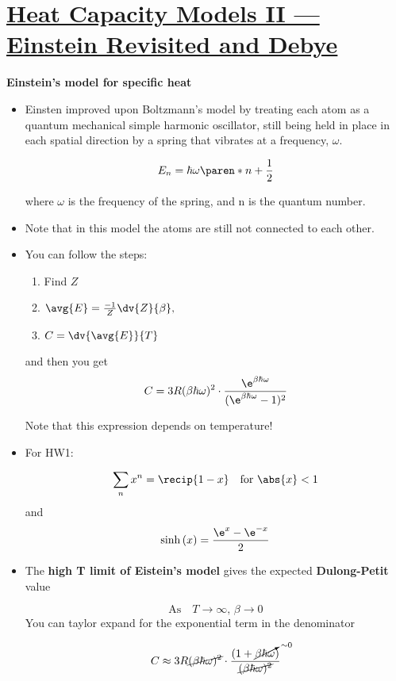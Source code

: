 \section[Heat Capacity Models II — Einstein Revisited and Debye]{\hyperlink{toc}{Heat Capacity Models II — Einstein Revisited and Debye}}


\textbf{Einstein's model for specific heat}

\begin{itemize}
    \item Einsten improved upon Boltzmann's model by treating each atom as a quantum mechanical simple harmonic oscillator, still being held in place in each spatial direction by a spring that vibrates at a frequency, $\omega$.

    \[ E_n = \hbar \omega \paren*{n + \frac{1}{2}}\]

    where $\omega$ is the frequency of the spring, and n is the quantum number.

    \item Note that in this model the atoms are still not connected to each other.


    \item You can follow the steps:

    \begin{enumerate}
        \item Find $Z$
        \item $\avg{E} = \frac{-1}{Z} \dv{Z}{\beta},$
        \item $C = \dv{\avg{E}}{T}$
     \end{enumerate}

    and then you get 
    \[ C = 3R (\beta \hbar \omega)^2 \cdot \frac{\e^{\beta \hbar \omega}}{(\e^{\beta \hbar \omega} -1)^2}\]

    Note that this expression depends on temperature! 

    \item For HW1:

    \[ \sum_n x^n = \recip{1-x} \quad \text{for } \abs{x} < 1\]
    and
    \[ \sinh{(x)} = \frac{\e^x - \e^{-x}}{2}\]


    \item The \textbf{high T limit of Eistein's model} gives the expected \textbf{Dulong-Petit} value

    \[ \text{As} \quad T \rightarrow \infty, \, \beta \rightarrow 0  \]
    You can taylor expand for the exponential term in the denominator

    \[ C \approx 3R \cancel{(\beta \hbar \omega)^2} \cdot \frac{(1+ \cancelto{\sim 0}{\beta \hbar \omega})}{\cancel{(\beta \hbar \omega)^2}}\]


\end{itemize}
